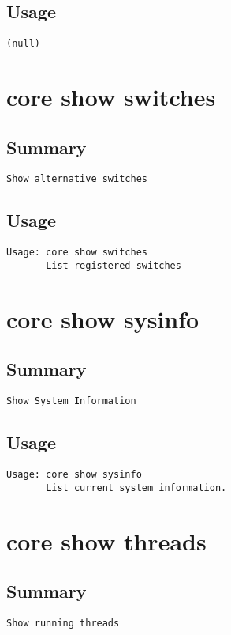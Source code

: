 \subsection{Usage}
\begin{verbatim}
(null)
\end{verbatim}


\section{core show switches}
\subsection{Summary}
\begin{verbatim}
Show alternative switches
\end{verbatim}
\subsection{Usage}
\begin{verbatim}
Usage: core show switches
       List registered switches

\end{verbatim}


\section{core show sysinfo}
\subsection{Summary}
\begin{verbatim}
Show System Information
\end{verbatim}
\subsection{Usage}
\begin{verbatim}
Usage: core show sysinfo
       List current system information.

\end{verbatim}


\section{core show threads}
\subsection{Summary}
\begin{verbatim}
Show running threads
\end{verbatim}
